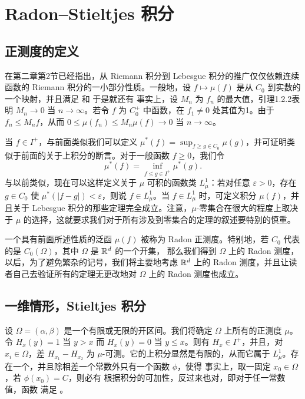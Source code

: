 \chapter{Radon--Stieltjes 积分}
\section{正测度的定义}
在第二章第2节已经指出，从 Riemann 积分到 Lebesgue 积分的推广仅仅依赖连续函数的 Riemann 积分的一小部分性质。一般地，设 $f\mapsto\mu(f)$ 是从 $C_0$ 到实数的一个映射，并且满足
和
于是就还有
事实上，设 $M_n$ 为 $f_n$ 的最大值，引理1.2.2表明 $M_n\to0$ 当 $n\to\infty$。若令 $f$ 为 $C_0^+$ 中函数，在 $f_1\ne0$ 处其值为1。由于 $f_n\le M_nf$，从而 $0\le\mu(f_n)\le M_n\mu(f)\to0$ 当 $n\to\infty$。

当 $f\in I^+$，与前面类似我们可以定义 $\mu^*(f)=\sup_{f\ge g\in C_0}\mu(g)$，并可证明类似于前面的关于上积分的断言。对于一般函数 $f\ge0$，我们令
\[\mu^*(f)=\inf_{f\le g\in I^+}\mu^*(g).\]
与以前类似，现在可以这样定义关于 $\mu$ 可积的函数类 $L^1_\mu$：若对任意 $\varepsilon>0$，存在 $g\in C_0$ 使 $\mu^*(|f-g|)<\varepsilon$，则说 $f\in L^1_\mu$。当 $f\in L^1_\mu$ 时，可定义积分 $\mu(f)$，并且关于 Lebesgue 积分的那些定理完全成立。注意，$\mu$-零集合在很大的程度上取决于 $\mu$ 的选择，这就要求我们对于所有涉及到零集合的定理的叙述要特别的慎重。

一个具有前面所述性质的泛函 $\mu(f)$ 被称为 Radon 正测度。特别地，若 $C_0$ 代表的是 $C_0(\Omega)$，其中 $\Omega$ 是 $\mathbb R^d$ 的一个开集，
那么我们得到 $\Omega$ 上的 Radon 测度，以后，为了避免繁杂的记号，我们将主要地考虑 $\mathbb R^d$ 上的 Radon 测度，并且让读者自己去验证所有的定理无更改地对 $\Omega$ 上的 Radon 测度也成立。
\section{一维情形，Stieltjes 积分}
设 $\Omega=(\alpha,\beta)$ 是一个有限或无限的开区间。我们将确定 $\Omega$ 上所有的正测度 $\mu$。令 $H_x(y)=1$ 当 $y>x$ 而 $H_x(y)=0$ 当 $y\le x$。则有 $H_x\in I^+$，并且，对 $x_i\in\Omega$，差 $H_{x_1}-H_{x_2}$ 为 $\mu$-可测。它的上积分显然是有限的，从而它属于 $L^1_\mu$。存在一个，并且除相差一个常数外只有一个函数 $\phi$，使得
事实上，取一固定 $x_0\in\Omega$，若 $\phi(x_0)=C$，则必有
根据积分的可加性，反过来也对，即对于任一常数值，函数  满足 。

